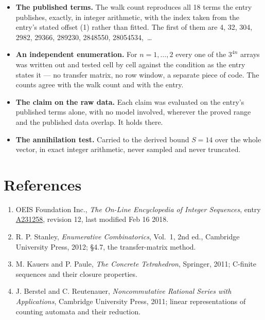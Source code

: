\documentclass[11pt]{article}
\theoremstyle{definition}
\begin{document}
\begin{itemize}

\item {\bfseries The published terms.} The walk count reproduces all 18 terms the entry publishes, exactly, in integer arithmetic, with the index taken from the entry's stated offset (1) rather than fitted. The first of them are 4, 32, 304, 2982, 29366, 289230, 2848550, 28054534,~\dots

\item {\bfseries An independent enumeration.} For $n = 1,\dots,2$ every one of the $3^{4n}$ arrays was written out and tested cell by cell against the condition as the entry states it --- no transfer matrix, no row window, a separate piece of code. The counts agree with the walk count and with the entry.

\item {\bfseries The claim on the raw data.} Each claim was evaluated on the entry's published terms alone, with no model involved, wherever the proved range and the published data overlap. It holds there.

\item {\bfseries The annihilation test.} Carried to the derived bound $S = 14$ over the whole vector, in exact integer arithmetic, never sampled and never truncated.

\end{itemize}

\section{References}

\begin{enumerate}

\item OEIS Foundation Inc., \emph{The On-Line Encyclopedia of Integer Sequences}, entry \href{https://oeis.org/A231258}{A231258}, revision 12, last modified Feb 16 2018.

\item R. P. Stanley, \emph{Enumerative Combinatorics}, Vol.~1, 2nd ed., Cambridge University Press, 2012; \S4.7, the transfer-matrix method.

\item M. Kauers and P. Paule, \emph{The Concrete Tetrahedron}, Springer, 2011; C-finite sequences and their closure properties.

\item J. Berstel and C. Reutenauer, \emph{Noncommutative Rational Series with Applications}, Cambridge University Press, 2011; linear representations of counting automata and their reduction.

\end{enumerate}
\end{document}
